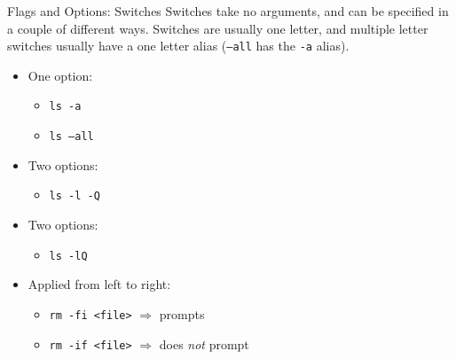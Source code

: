 \begin{frame}[fragile]{Flags and Options: Switches}
  Switches take no arguments, and can be specified in a couple of different ways.  Switches are usually
  one letter, and multiple letter switches usually have a one letter alias (\texttt{--all} has the \texttt{-a} alias).
  \begin{itemize}
    \item One option:
    \begin{itemize}
      \item \texttt{ls -a}
      \item \texttt{ls --all}
    \end{itemize}
    \item Two options:
    \begin{itemize}
      \item \texttt{ls -l -Q}
    \end{itemize}
    \item Two options:
    \begin{itemize}
      \item \texttt{ls -lQ}
    \end{itemize}
    \item Applied from left to right:
    \begin{itemize}
      \item \texttt{rm -fi <file>} $\Rightarrow$ prompts
      \item \texttt{rm -if <file>} $\Rightarrow$ does \emph{not} prompt
    \end{itemize}
  \end{itemize}
\end{frame}

